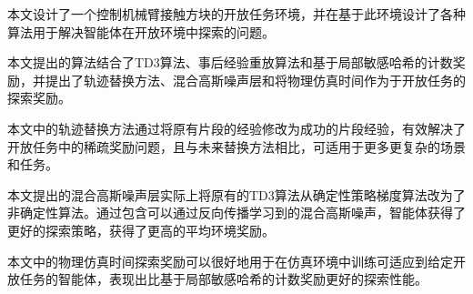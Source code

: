 \begin{conclusions}

    本文设计了一个控制机械臂接触方块的开放任务环境，并在基于此环境设计了各种算法用于解决智能体在开放环境中探索的问题。
    
    本文提出的算法结合了TD3算法、事后经验重放算法和基于局部敏感哈希的计数奖励，并提出了轨迹替换方法、混合高斯噪声层和将物理仿真时间作为于开放任务的探索奖励。

    本文中的轨迹替换方法通过将原有片段的经验修改为成功的片段经验，有效解决了开放任务中的稀疏奖励问题，且与未来替换方法相比，可适用于更多更复杂的场景和任务。

    本文提出的混合高斯噪声层实际上将原有的TD3算法从确定性策略梯度算法改为了非确定性算法。通过包含可以通过反向传播学习到的混合高斯噪声，智能体获得了更好的探索策略，获得了更高的平均环境奖励。

    本文中的物理仿真时间探索奖励可以很好地用于在仿真环境中训练可适应到给定开放任务的智能体，表现出比基于局部敏感哈希的计数奖励更好的探索性能。
\end{conclusions}
